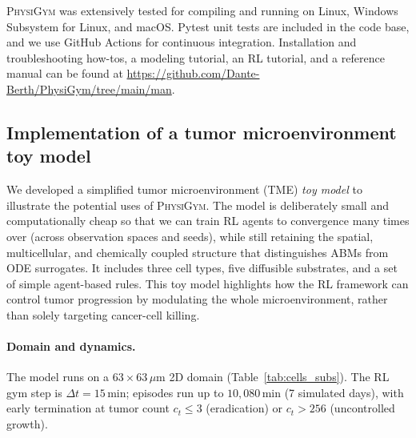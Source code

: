 \documentclass{article}
\newcommand{\physigym}{\textsc{PhysiGym}}
\begin{document}
\physigym{} was extensively tested for compiling and running on Linux, Windows
Subsystem for Linux, and macOS. Pytest unit tests are included in the code base,
and we use GitHub Actions for continuous integration. Installation and
troubleshooting how-tos, a modeling tutorial, an RL tutorial, and a reference
manual can be found at
\url{https://github.com/Dante-Berth/PhysiGym/tree/main/man}.

\subsection{Implementation of a tumor microenvironment toy model}
\label{sec:model}

We developed a simplified tumor microenvironment (TME) \emph{toy model} to
illustrate the potential uses of \physigym{}. The model is deliberately small
and computationally cheap so that we can train RL agents to convergence many
times over (across observation spaces and seeds), while still retaining the
spatial, multicellular, and chemically coupled structure that distinguishes
ABMs from ODE surrogates. It includes three cell types, five diffusible
substrates, and a set of simple agent-based rules. This toy model highlights how
the RL framework can control tumor progression by modulating the whole
microenvironment, rather than solely targeting cancer-cell killing.

\paragraph{Domain and dynamics.}
The model runs on a $63\!\times\!63\,\mu$m 2D domain (Table~\ref{tab:cells_subs}).
The RL gym step is $\Delta t = 15$\,min; episodes run up to $10{,}080$\,min
(7 simulated days), with early termination at tumor count $c_t \le 3$
(eradication) or $c_t > 256$ (uncontrolled growth).
\end{document}

